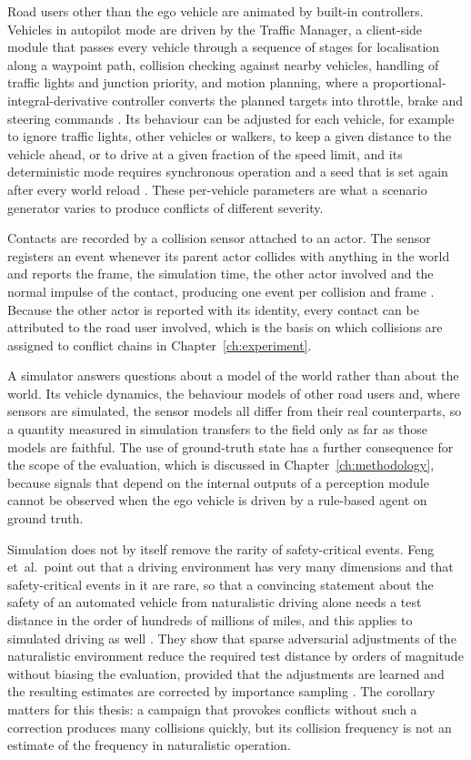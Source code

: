 Road users other than the ego vehicle are animated by built-in controllers. Vehicles
in autopilot mode are driven by the Traffic Manager, a client-side module that passes
every vehicle through a sequence of stages for localisation along a waypoint path,
collision checking against nearby vehicles, handling of traffic lights and junction
priority, and motion planning, where a proportional-integral-derivative controller
converts the planned targets into throttle, brake and steering commands
\cite{carladocs_tm}. Its behaviour can be adjusted for each vehicle, for example to
ignore traffic lights, other vehicles or walkers, to keep a given distance to the
vehicle ahead, or to drive at a given fraction of the speed limit, and its
deterministic mode requires synchronous operation and a seed that is set again after
every world reload \cite{carladocs_tm}. These per-vehicle parameters are what a
scenario generator varies to produce conflicts of different severity.

Contacts are recorded by a collision sensor attached to an actor. The sensor registers
an event whenever its parent actor collides with anything in the world and reports the
frame, the simulation time, the other actor involved and the normal impulse of the
contact, producing one event per collision and frame \cite{carladocs_sensors}. Because
the other actor is reported with its identity, every contact can be attributed to the
road user involved, which is the basis on which collisions are assigned to conflict
chains in Chapter~\ref{ch:experiment}.

A simulator answers questions about a model of the world rather than about the world.
Its vehicle dynamics, the behaviour models of other road users and, where sensors are
simulated, the sensor models all differ from their real counterparts, so a quantity
measured in simulation transfers to the field only as far as those models are
faithful. The use of ground-truth state has a further consequence for the scope of
the evaluation, which is discussed in Chapter~\ref{ch:methodology}, because signals
that depend on the internal outputs of a perception module cannot be observed when the
ego vehicle is driven by a rule-based agent on ground truth.

Simulation does not by itself remove the rarity of safety-critical events. Feng et~al.\
point out that a driving environment has very many dimensions and that safety-critical
events in it are rare, so that a convincing statement about the safety of an automated
vehicle from naturalistic driving alone needs a test distance in the order of hundreds
of millions of miles, and this applies to simulated driving as well
\cite{feng2021nade}. They show that sparse
adversarial adjustments of the naturalistic environment reduce the required test
distance by orders of magnitude without biasing the evaluation, provided that the
adjustments are learned and the resulting estimates are corrected by importance
sampling \cite{feng2021nade}. The corollary matters for this thesis: a campaign that
provokes conflicts without such a correction produces many collisions quickly, but its
collision frequency is not an estimate of the frequency in naturalistic operation.

